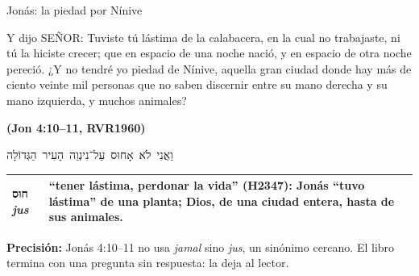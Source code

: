 \documentclass[hyperref={bookmarks=false},aspectratio=169]{beamer}
\newcommand{\heb}[1]{\mbox{\foreignlanguage{hebrew}{#1}}}
\newcommand{\SENOR}{S{\fontsize{0.78em}{1em}\selectfont EÑOR}}
\newcommand{\fuente}[1]{\par\hfill{\upshape\bfseries\footnotesize\textcolor{azul}{#1}}}
\newcommand{\precision}[1]{{\footnotesize\color{gris}\textbf{Precisión:} #1}}
\begin{document}
\begin{frame}{Jonás: la piedad por Nínive}
\begin{cita}Y dijo \SENOR: Tuviste tú lástima de la calabacera, en la cual no trabajaste, ni tú la hiciste crecer; que en espacio de una noche nació, y en espacio de otra noche pereció. ¿Y no tendré yo piedad de Nínive, aquella gran ciudad donde hay más de ciento veinte mil personas que no saben discernir entre su mano derecha y su mano izquierda, y muchos animales?\fuente{(Jon 4:10--11, RVR1960)}\end{cita}
\begin{center}\heb{וַאֲנִי לֹא אָחוּס עַל־נִינְוֵה הָעִיר הַגְּדוֹלָה}\end{center}
\scriptsize\renewcommand{\arraystretch}{1.12}
\begin{tabular}{@{}>{\RaggedRight\arraybackslash}p{2.2cm}>{\RaggedRight\arraybackslash}p{9.6cm}@{}}
\toprule
\heb{חוּס} \emph{jus} & ``tener lástima, perdonar la vida'' (H2347): Jonás ``tuvo lástima'' de una planta; Dios, de una ciudad entera, hasta de sus animales. \\
\bottomrule
\end{tabular}\par\smallskip
\precision{Jonás 4:10--11 no usa \emph{jamal} sino \emph{jus}, un sinónimo cercano. El libro termina con una pregunta sin respuesta: la deja al lector.}
\end{frame}
\end{document}
